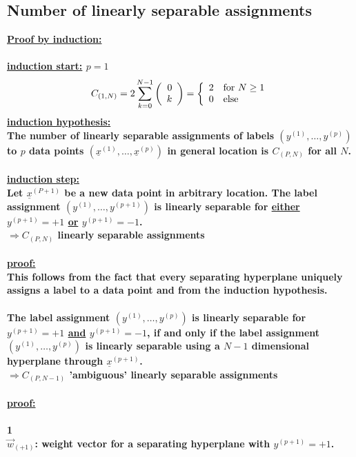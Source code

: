 \subsection{Number of linearly separable assignments}
\bf\underline{Proof by induction:}\rm\\\\
\underline{induction start:} $p = 1$
\begin{equation}
	C_{(1,N)} = 2\sum_{k=0}^{N-1} \left( \begin{array}{rrrrrrrrrrrrrrrrrrrrrrrrrr} 0\\k\\ \end{array} \right) = 
		\left\{ \begin{array}{ll}
			2 & \textrm{for } N \geq 1\\
			0 & \textrm{else}
		\end{array}\right.
\end{equation}
\underline{induction hypothesis:}\\
The number of linearly separable assignments of labels $(y^{(1)}, \ldots, y^{(p)})$ to $p$ data points $(\underline{x}^{(1)}, \ldots, \underline{x}^{(p)})$ in general location is $C_{(P, N)}$ for all $N$.\\\\
\underline{induction step:}\\
Let $\underline{x}^{(P + 1)}$ be a new data point in arbitrary location. The label assignment $(y^{(1)}, \ldots, y^{(p + 1)})$ is linearly separable for \underline{either} $y^{(p + 1)} = +1$ \underline{or} $y^{(p + 1)} = -1$.\\
$\Rightarrow C_{(P, N)}$ linearly separable assignments\\\\
\underline{proof:}\\
This follows from the fact that every separating hyperplane uniquely assigns a label to a data point and from the induction hypothesis.\\\\
The label assignment $(y^{(1)}, \ldots, y^{(p)})$ is linearly separable for $y^{(p + 1)} = +1$ \underline{and} $y^{(p + 1)} = -1$, if and only if the label assignment $(y^{(1)}, \ldots, y^{(p)})$ is linearly separable using a $N-1$ dimensional hyperplane through $\underline{x}^{(p + 1)}$.\\
$\Rightarrow C_{(P, N-1)}$ 'ambiguous' linearly separable assignments\\\\
\underline{proof:}\\\\
\textcircled{1}\\
$\vec{w}_{(+1)}$: weight vector for a separating hyperplane with $y^{(p + 1)} = +1$.\\
